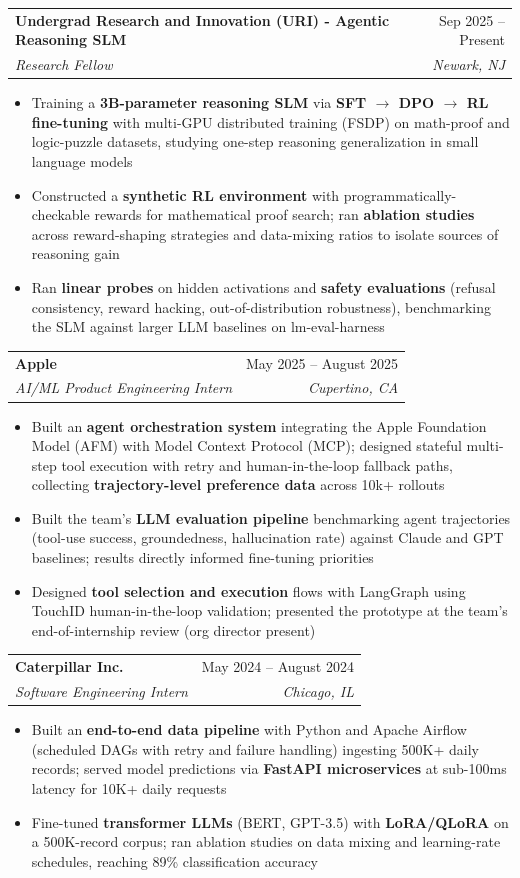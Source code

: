\documentclass[letterpaper,10pt]{article}
\makeatletter
\newcommand{\resumeItem}[1]{
  \item\small{
    {#1 \vspace{-3pt}}
  }
}
\newcommand{\resumeSubheading}[4]{
  \vspace{-3pt}\item
    \begin{tabular*}{0.97\textwidth}[t]{l@{\extracolsep{\fill}}r}
      \textbf{#1} & #2 \\
      \textit{\small#3} & \textit{\small #4} \\
    \end{tabular*}\vspace{-9pt}
}
\newcommand{\resumeItemListStart}{\begin{itemize}}
\newcommand{\resumeItemListEnd}{\end{itemize}\vspace{-7pt}}
\makeatother
\begin{document}
\vspace{5pt}
\resumeSubheading
{Undergrad Research and Innovation (URI) - Agentic Reasoning SLM}{Sep 2025 -- Present}
{Research Fellow}{Newark, NJ}
\vspace{5pt}
\resumeItemListStart
\resumeItem{Training a \textbf{3B-parameter reasoning SLM} via \textbf{SFT $\rightarrow$ DPO $\rightarrow$ RL fine-tuning} with multi-GPU distributed training (FSDP) on math-proof and logic-puzzle datasets, studying one-step reasoning generalization in small language models}
\resumeItem{Constructed a \textbf{synthetic RL environment} with programmatically-checkable rewards for mathematical proof search; ran \textbf{ablation studies} across reward-shaping strategies and data-mixing ratios to isolate sources of reasoning gain}
\resumeItem{Ran \textbf{linear probes} on hidden activations and \textbf{safety evaluations} (refusal consistency, reward hacking, out-of-distribution robustness), benchmarking the SLM against larger LLM baselines on lm-eval-harness}
\resumeItemListEnd
\vspace{5pt}
\resumeSubheading
{Apple}{May 2025 -- August 2025}
{AI/ML Product Engineering Intern}{Cupertino, CA}
\vspace{5pt}
\resumeItemListStart
\resumeItem{Built an \textbf{agent orchestration system} integrating the Apple Foundation Model (AFM) with Model Context Protocol (MCP); designed stateful multi-step tool execution with retry and human-in-the-loop fallback paths, collecting \textbf{trajectory-level preference data} across 10k+ rollouts}
\resumeItem{Built the team's \textbf{LLM evaluation pipeline} benchmarking agent trajectories (tool-use success, groundedness, hallucination rate) against Claude and GPT baselines; results directly informed fine-tuning priorities}
\resumeItem{Designed \textbf{tool selection and execution} flows with LangGraph using TouchID human-in-the-loop validation; presented the prototype at the team's end-of-internship review (org director present)}
\resumeItemListEnd


\vspace{5pt}
\resumeSubheading
{Caterpillar Inc.}{May 2024 -- August 2024}
{Software Engineering Intern}{Chicago, IL}
\vspace{5pt}
\resumeItemListStart
\resumeItem{Built an \textbf{end-to-end data pipeline} with Python and Apache Airflow (scheduled DAGs with retry and failure handling) ingesting 500K+ daily records; served model predictions via \textbf{FastAPI microservices} at sub-100ms latency for 10K+ daily requests}
\resumeItem{Fine-tuned \textbf{transformer LLMs} (BERT, GPT-3.5) with \textbf{LoRA/QLoRA} on a 500K-record corpus; ran ablation studies on data mixing and learning-rate schedules, reaching 89\% classification accuracy}
\resumeItemListEnd
\end{document}

